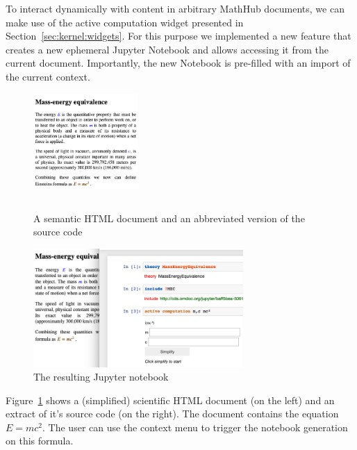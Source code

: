 To interact dynamically with content in arbitrary MathHub documents, we can make use of the active computation widget presented in Section~\ref{sec:kernel:widgets}. 
For this purpose we implemented a new feature that creates a new ephemeral Jupyter Notebook and allows accessing it from the current document. 
Importantly, the new Notebook is pre-filled with an import of the current context. 

\begin{figure}[h]
  \begin{minipage}[c]{4cm}
  \vspace{-20pt}
  \includegraphics[width=4cm]{screenshots/sciencedoc}
  \end{minipage}
  \begin{minipage}[c]{7cm}
    
    \begin{lstlisting}
    \end{lstlisting}
  \end{minipage}
  \caption{A semantic HTML document and an abbreviated version of the source code}\label{fig:conversionHTML}
\end{figure}

\begin{figure}
\includegraphics[width=8cm]{screenshots/emc}
\caption{The resulting Jupyter notebook}\label{fig:conversionNotebook}
\end{figure}

Figure~\ref{fig:conversionHTML} shows a (simplified) scientific HTML document (on the left) and an extract of it's source code (on the right). 
The document contains the equation $E=mc^2$. 
The user can use the context menu to trigger the notebook generation on this formula.

